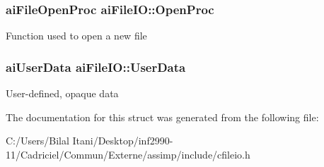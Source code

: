 \subsubsection[{\texorpdfstring{Open\+Proc}{OpenProc}}]{\setlength{\rightskip}{0pt plus 5cm}ai\+File\+Open\+Proc ai\+File\+I\+O\+::\+Open\+Proc}\hypertarget{structai_file_i_o_a819d9c7823039294125068d06949a6df}{}\label{structai_file_i_o_a819d9c7823039294125068d06949a6df}
Function used to open a new file 
\subsubsection[{\texorpdfstring{User\+Data}{UserData}}]{\setlength{\rightskip}{0pt plus 5cm}ai\+User\+Data ai\+File\+I\+O\+::\+User\+Data}\hypertarget{structai_file_i_o_a9c62b7f3d70fbb2f41e33ad0b9933139}{}\label{structai_file_i_o_a9c62b7f3d70fbb2f41e33ad0b9933139}
User-\/defined, opaque data 

The documentation for this struct was generated from the following file\+:\begin{DoxyCompactItemize}
\item 
C\+:/\+Users/\+Bilal Itani/\+Desktop/inf2990-\/11/\+Cadriciel/\+Commun/\+Externe/assimp/include/cfileio.\+h\end{DoxyCompactItemize}
